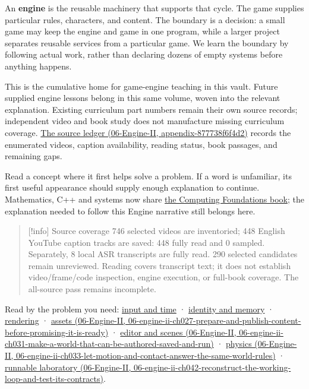 An \textbf{engine} is the reusable machinery that supports that cycle. The game supplies particular rules, characters, and content. The boundary is a decision: a small game may keep the engine and game in one program, while a larger project separates reusable services from a particular game. We learn the boundary by following actual work, rather than declaring dozens of empty systems before anything happens.

This is the cumulative home for game-engine teaching in this vault. Future supplied engine lessons belong in this same volume, woven into the relevant explanation. Existing curriculum part numbers remain their own source records; independent video and book study does not manufacture missing curriculum coverage. \href{../06-Engine-II/main.pdf\#nameddest=appendix-877738f6f4d2}{The source ledger (06-Engine-II, appendix-877738f6f4d2)} records the enumerated videos, caption availability, reading status, book passages, and remaining gaps.

Read a concept where it first helps solve a problem. If a word is unfamiliar, its first useful appearance should supply enough explanation to continue. Mathematics, C++ and systems now share \hyperref[volume-reading-map]{the Computing Foundations book}; the explanation needed to follow this Engine narrative still belongs here.

\begin{quote}
{[}!info{]} Source coverage 746 selected videos are inventoried; 448 English YouTube caption tracks are saved: 448 fully read and 0 sampled. Separately, 8 local ASR transcripts are fully read. 290 selected candidates remain unreviewed. Reading covers transcript text; it does not establish video/frame/code inspection, engine execution, or full-book coverage. The all-source pass remains incomplete.
\end{quote}

Read by the problem you need: \hyperref[05-engine-i-ch013-let-one-input-produce-one-intended-change]{input and time} · \hyperref[05-engine-i-ch014-keep-identity-storage-and-ownership-in-agreement]{identity and memory} · \hyperref[05-engine-i-ch018-give-the-renderer-a-clear-job-then-meet-the-graphics-api]{rendering} · \href{../06-Engine-II/main.pdf\#nameddest=06-engine-ii-ch027-prepare-and-publish-content-before-promising-it-is-ready}{assets (06-Engine-II, 06-engine-ii-ch027-prepare-and-publish-content-before-promising-it-is-ready)} · \href{../06-Engine-II/main.pdf\#nameddest=06-engine-ii-ch031-make-a-world-that-can-be-authored-saved-and-run}{editor and scenes (06-Engine-II, 06-engine-ii-ch031-make-a-world-that-can-be-authored-saved-and-run)} · \href{../06-Engine-II/main.pdf\#nameddest=06-engine-ii-ch033-let-motion-and-contact-answer-the-same-world-rules}{physics (06-Engine-II, 06-engine-ii-ch033-let-motion-and-contact-answer-the-same-world-rules)} · \href{../06-Engine-II/main.pdf\#nameddest=06-engine-ii-ch042-reconstruct-the-working-loop-and-test-its-contracts}{runnable laboratory (06-Engine-II, 06-engine-ii-ch042-reconstruct-the-working-loop-and-test-its-contracts)}.

